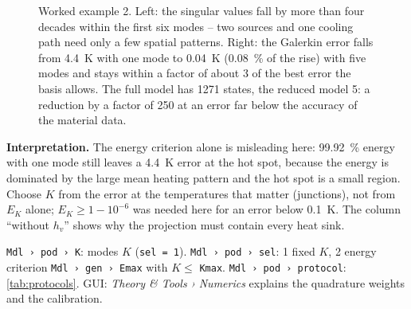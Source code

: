 \documentclass[11pt,a4paper]{article}
\newcommand{\cfg}[1]{\texttt{#1}}
\begin{document}
\begin{figure}[h]\centering
{}
\caption{Worked example 2. Left: the singular values fall by more than four decades within the first six modes --
two sources and one cooling path need only a few spatial patterns. Right: the Galerkin error falls from
\SI{4.4}{\kelvin} with one mode to \SI{0.04}{\kelvin} (\SI{0.08}{\percent} of the rise) with five modes and stays
within a factor of about 3 of the best error the basis allows. The full model has 1271 states, the reduced model 5:
a reduction by a factor of 250 at an error far below the accuracy of the material data.}
\label{fig:pod}
\end{figure}

\textbf{Interpretation.} The energy criterion alone is misleading here: \SI{99.92}{\percent} energy with one mode
still leaves a \SI{4.4}{\kelvin} error at the hot spot, because the energy is dominated by the large mean heating
pattern and the hot spot is a small region. Choose $K$ from the error at the temperatures that matter (junctions),
not from $E_K$ alone; $E_K\ge 1-10^{-6}$ was needed here for an error below \SI{0.1}{\kelvin}. The column ``without
$h_v$'' shows why the projection must contain every heat sink.

\begin{cfgbox}
\cfg{Mdl › pod › K}: modes $K$ (\cfg{sel = 1}). \cfg{Mdl › pod › sel}: 1 fixed $K$, 2 energy criterion
\cfg{Mdl › gen › Emax} with $K\le$ \cfg{Kmax}. \cfg{Mdl › pod › protocol}: \cref{tab:protocols}.
GUI: \emph{Theory \& Tools › Numerics} explains the quadrature weights and the calibration.
\end{cfgbox}
\end{document}
